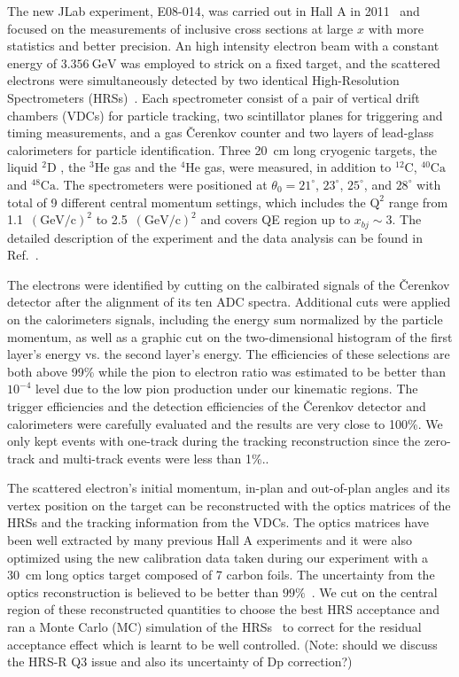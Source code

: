 
The new JLab experiment, E08-014, was carried out in Hall A in 2011~\cite{e08014_pr} and focused on the measurements of inclusive cross sections at large $x$ with more statistics and better precision. An high intensity electron beam with a constant energy of $3.356~\mathrm{GeV}$ was employed to strick on a fixed target, and the scattered electrons were simultaneously detected by two identical High-Resolution Spectrometers (HRSs)~\cite{halla_nim}. Each spectrometer consist of a pair of vertical drift chambers (VDCs) for particle tracking, two scintillator planes for triggering and timing measurements, and a gas \v{C}erenkov counter and two layers of lead-glass calorimeters for particle identification. Three 20~cm long cryogenic targets, the liquid $\mathrm{^{2}D}$ , the $\mathrm{^{3}He}$ gas and the $\mathrm{^{4}He}$ gas, were measured, in addition to $\mathrm{^{12}C}$, $\mathrm{^{40}Ca}$ and $\mathrm{^{48}Ca}$. The spectrometers were positioned at $\theta_{0}=21^\circ$, $23^\circ$, $25^\circ$, and $28^\circ$ with total of 9 different central momentum settings, which includes the $\mathrm{Q^{2}}$ range from 1.1~$\mathrm{(GeV/c)^{2}}$ to 2.5~$\mathrm{(GeV/c)^{2}}$ and covers QE region up to $x_{bj}\sim 3$. The detailed description of the experiment and the data analysis can be found in Ref.~\cite{zye_thesis}.

The electrons were identified by cutting on the calbirated signals of the \v{C}erenkov detector after the alignment of its ten ADC spectra. Additional cuts were applied on the calorimeters signals, including the energy sum normalized by the particle momentum, as well as a graphic cut on the two-dimensional histogram of the first layer's energy vs. the second layer's energy. The efficiencies of these selections are both above 99\% while the pion to electron ratio was estimated to be better than $\mathrm{10^{-4}}$ level due to the low pion production under our kinematic regions. The trigger efficiencies and the detection efficiencies of the \v{C}erenkov detector and calorimeters were carefully evaluated and the results are very close to 100\%.  We only kept events with one-track during the tracking reconstruction since the zero-track and multi-track events were less than 1\%.. 

The scattered electron's initial momentum, in-plan and out-of-plan angles and its vertex position on the target can be reconstructed with the optics matrices of the HRSs and the tracking information from the VDCs. The optics matrices have been well extracted by many previous Hall A experiments and it were also optimized using the new calibration data taken during our experiment with a 30~cm long optics target composed of 7 carbon foils. The uncertainty from the optics reconstruction is believed to be better than $99\%$~\cite{halla_nim}. We cut on the central region of these reconstructed quantities to choose the best HRS acceptance and ran a Monte Carlo (MC) simulation of the HRSs~\cite{zye_thesis} to correct for the residual acceptance effect which is learnt to be well controlled. (Note: should we discuss the HRS-R Q3 issue and also its uncertainty of Dp correction?)

